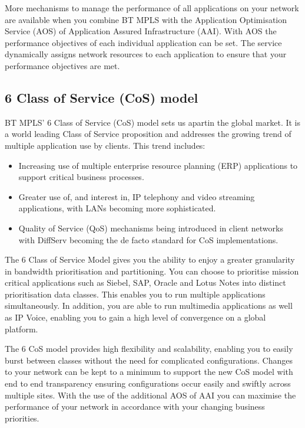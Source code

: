 More mechanisms to manage the performance of all applications on your network are available when you combine BT MPLS with the Application Optimisation Service (AOS) of Application Assured Infrastructure (AAI). With AOS the performance objectives of each individual application can be set. The service dynamically assigns network resources to each application to ensure that your performance objectives are met.

\subsection{6 Class of Service (CoS) model}
BT MPLS' 6 Class of Service (CoS) model sets us apartin the global market. It is a world leading Class of Service proposition and addresses the growing trend of multiple application use by clients. This trend includes:

\begin{itemize}
\item Increasing use of multiple enterprise resource planning (ERP) applications to support critical business processes.
\item Greater use of, and interest in, IP telephony and video streaming applications, with LANs becoming more sophisticated.
\item Quality of Service (QoS) mechanisms being introduced in client networks with DiffServ becoming the de facto standard for CoS implementations.
\end{itemize}

The 6 Class of Service Model gives you the ability to enjoy a greater granularity in bandwidth prioritisation and partitioning. You can choose to prioritise mission critical applications such as Siebel, SAP, Oracle and Lotus Notes into distinct prioritisation data classes. This enables you to run multiple applications simultaneously. In addition, you are able to run multimedia applications as well as IP Voice, enabling you to gain a high level of convergence on a global platform.

The 6 CoS model provides high flexibility and scalability, enabling you to easily burst between classes without the need for complicated configurations. Changes to your network can be kept to a minimum to support the new CoS model with end to end transparency ensuring configurations occur easily and swiftly across multiple sites. With the use of the additional AOS of AAI you can maximise the performance of your network in accordance with your changing business priorities.

